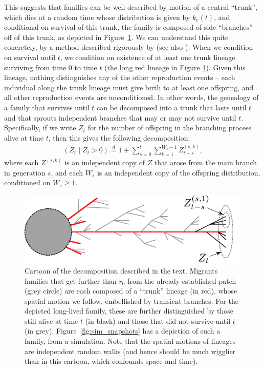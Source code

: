 \documentclass{article}
\newcommand{\citet}[1]{\cite{#1}}
\renewcommand{\P}{\mathbb{P}}
\newcommand{\deq}{\stackrel{\scriptscriptstyle{d}}{=}}
\begin{document}
This suggests that families can be well-described by motion of a central ``trunk'',
which dies at a random time whose distribution is given by $k_e(t)$,
and conditional on survival of this trunk, the family is composed of side ``branches'' off of this trunk,
as depicted in Figure~\ref{fig:branching_decomp}.
We can understand this quite concretely, by a method described rigorously by \citet{geiger1999elementary} (see also \citet{chauvin1991growing}).
When we condition on survival until $t$, we condition on existence of
at least one trunk lineage surviving from time $0$ to time $t$ (the long red
lineage in Figure \ref{fig:branching_decomp}).
Given this lineage, nothing distinguishes any of the other reproduction events --
each individual along the trunk lineage must give birth to at least one offspring,
and all other reproduction events are unconditioned.
In other words, the genealogy of a family that survives until $t$
can be decomposed into a trunk that lasts until $t$
and that sprouts independent branches that may or may not survive until $t$.
Specifically, if we write $Z_t$ for the number of offspring in the branching process alive at time $t$,
then this gives the following decomposition:
\begin{align}
  \left( Z_t \; \vert \; Z_t>0 \right) \deq 1 + \sum_{s=0}^t \sum_{k=1}^{W_s-1} Z^{(s,k)}_{t-s},
\end{align}
where each $Z^{(s,k)}$ is an independent copy of $Z$ 
that arose from the main branch in generation $s$,
and each $W_s$ is an independent copy of the offspring distribution, conditioned on $W_s \ge 1$.


\begin{figure}[ht!!]
  \begin{center}
    \includegraphics{branching-concept}
  \end{center}
\caption{Cartoon of the decomposition described in the text. 
Migrants families that get further than $r_0$ from the already-established patch (grey circle)
are each composed of a ``trunk'' lineage (in red), whose spatial motion we follow,
embellished by transient branches.
For the depicted long-lived family, these are further distinguished by those still alive at time $t$ (in black)
and those that did not survive until $t$ (in grey).
Figure~\ref{fig:sim_snapshots} has a depiction of such a family, from a simulation. 
Note that the spatial motions of lineages are independent random walks
(and hence should be much wigglier than in this cartoon, which confounds space and time).
} \label{fig:branching_decomp}
\end{figure}
\end{document}
